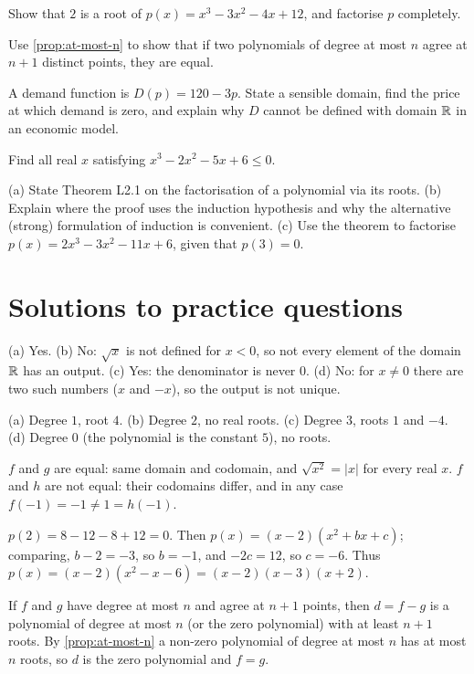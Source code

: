 \pq[mathematical] Show that $2$ is a root of $p(x)=x^3-3x^2-4x+12$, and factorise $p$ completely.

\pq[mathematical] Use \cref{prop:at-most-n} to show that if two polynomials of degree at most $n$ agree at $n+1$ distinct
points, they are equal.

\pq[application] A demand function is $D(p)=120-3p$. State a sensible domain, find the price at which demand is zero, and
explain why $D$ cannot be defined with domain $\mathbb{R}$ in an economic model.

 Find all real $x$ satisfying $x^3-2x^2-5x+6\le0$.

 (a) State Theorem L2.1 on the factorisation of a polynomial via its roots. (b) Explain where the proof uses
the induction hypothesis and why the alternative (strong) formulation of induction is convenient. (c) Use the theorem to
factorise $p(x)=2x^3-3x^2-11x+6$, given that $p(3)=0$.

\section{Solutions to practice questions}
(a) Yes. (b) No: $\sqrt x$ is not defined for $x<0$, so not every element of the domain $\mathbb{R}$ has an output. (c) Yes: the
denominator is never $0$. (d) No: for $x\ne0$ there are two such numbers ($x$ and $-x$), so the output is not unique.

(a) Degree $1$, root $4$. (b) Degree $2$, no real roots. (c) Degree $3$, roots $1$ and $-4$. (d) Degree $0$ (the polynomial
is the constant $5$), no roots.

$f$ and $g$ are equal: same domain and codomain, and $\sqrt{x^2}=|x|$ for every real $x$. $f$ and $h$ are not equal: their
codomains differ, and in any case $f(-1)=-1\ne1=h(-1)$.

$p(2)=8-12-8+12=0$. Then $p(x)=(x-2)(x^2+bx+c)$; comparing, $b-2=-3$, so $b=-1$, and $-2c=12$, so $c=-6$. Thus
$p(x)=(x-2)(x^2-x-6)=(x-2)(x-3)(x+2)$.

If $f$ and $g$ have degree at most $n$ and agree at $n+1$ points, then $d=f-g$ is a polynomial of degree at most $n$ (or
the zero polynomial) with at least $n+1$ roots. By \cref{prop:at-most-n} a non-zero polynomial of degree at most $n$ has at
most $n$ roots, so $d$ is the zero polynomial and $f=g$.

